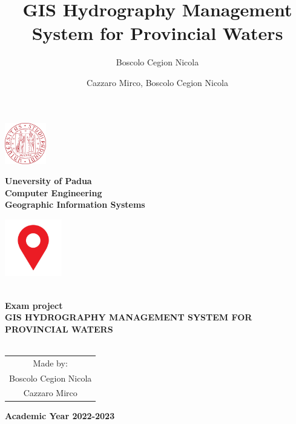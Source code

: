 \documentclass[a4paper, 11pt]{article}
\title{GIS Hydrography Management System for Provincial Waters}
\author{Boscolo Cegion Nicola}
\author{Cazzaro Mirco, Boscolo Cegion Nicola}
\date{}
\begin{document}
\begin{center}
	\begin{minipage}{2.5cm}
	\begin{center}
		\includegraphics[height=1.8cm]{img/unipd.png}
		
	\end{center}
\end{minipage}\hfill
\begin{minipage}{10cm}
	\begin{center}
	\textbf{Uneversity of Padua}\\[0.1cm]
    \textbf{Computer Engineering}\\[0.1cm]
    \textbf{Geographic Information Systems}


	\end{center}
\end{minipage}\hfill
\begin{minipage}{2.5cm}
	\begin{center}
		\includegraphics[height=2.5cm]{img/pin.jpg}
	\end{center}

\end{minipage}



\textsc{\Large }\\[1.5cm]
{\large \bfseries Exam project}\\[4.5cm]


{\huge \bfseries \uppercase{GIS Hydrography Management System for Provincial Waters} \\[0.5cm] }
\textsc{\Large }\\[2.5cm]







\begin{tabular}{c}
    Made by:\\[0.5cm]
    {\LARGE Boscolo Cegion Nicola}\\[0.1cm]
    {\LARGE Cazzaro Mirco}\\[0.1cm]
    
\end{tabular}
\vfill

{\textbf{\large {Academic Year} 2022-2023}}

\end{center}


\pagebreak
\tableofcontents







\end{document}
